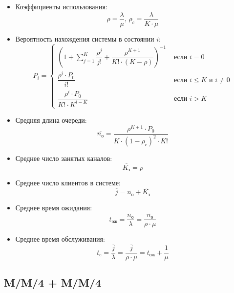\begin{itemize}
	\item Коэффициенты использования:
		\begin{displaymath}
			\rho = \dfrac{\lambda}{\mu}\text{,  } \rho_c = \dfrac{\lambda}{K \cdot \mu}
		\end{displaymath}
	\item Вероятность нахождения системы в состоянии $i$:
		\begin{displaymath}
			P_i = 
			\begin{cases}
				\left( 1 + \sum \limits_{j=1}^{K} \dfrac{\rho^j}{j!} + \dfrac{\rho^{K+1}}{K! \cdot (K - \rho)} \right)^{-1} &\text{ если } i = 0 \\[15pt]
				\dfrac{\rho^i \cdot P_0}{i!} &\text{ если } i \leq K \text{ и } i \neq 0 \\[15pt]
				\dfrac{\rho^i \cdot P_0}{K! \cdot K^{i-K}} &\text{ если } i > K
			\end{cases}
		\end{displaymath}
		
	\item Средняя длина очереди:
		\begin{displaymath}
			\overline{n_\text{о}} = \dfrac{\rho^{K+1} \cdot P_0}{K \cdot (1 - \rho_c)^2 \cdot K!}
		\end{displaymath}
		
	\item Среднее число занятых каналов:
		\begin{displaymath}
			\overline{K_\text{з}} = \rho
		\end{displaymath}
		
	\item Среднее число клиентов в системе:
		\begin{displaymath}
			\overline{j} = \overline{n_\text{о}} + \overline{K_\text{з}}
		\end{displaymath}
		
	\item Среднее время ожидания:
		\begin{displaymath}
			t_\text{ож} = \dfrac{\overline{n_\text{о}}}{\lambda} = \dfrac{\overline{n_\text{о}}}{\rho \cdot \mu}
		\end{displaymath}
		
	\item Среднее время обслуживания:
		\begin{displaymath}
			t_\text{c} = \dfrac{\overline{j}}{\lambda} = \dfrac{\overline{j}}{\rho \cdot \mu} = t_\text{ож} + \dfrac{1}{\mu}
		\end{displaymath}
\end{itemize}

\subsection{M/M/4 + M/M/4}


